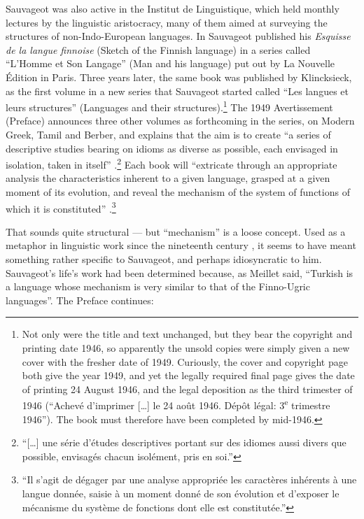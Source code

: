 \documentclass[output=paper]{langscibook}
\begin{document}
Sauvageot was also active in the Institut de Linguistique, which held monthly lectures by the linguistic aristocracy, many of them aimed at surveying the structures of non-Indo-European languages. In \citeyear{Sauvageot1946} Sauvageot published his \emph{Esquisse de la langue finnoise} (Sketch of the Finnish language) in a series called ``L’Homme et Son Langage'' (Man and his language) put out by La Nouvelle Édition in Paris. Three years later, the same book was published by Klincksieck, as the first volume in a new series that Sauvageot started called ``Les langues et leurs structures'' (Languages and their structures).\footnote{Not only were the title and text unchanged, but they bear the copyright and printing date 1946, so apparently the unsold copies were simply given a new cover with the fresher date of 1949. Curiously, the cover and copyright page both give the year 1949, and yet the legally required final page gives the date of printing 24 August 1946, and the legal deposition as the third trimester of 1946 (``Achevé d'imprimer […] le 24 août 1946. Dépôt légal: 3\textsuperscript{e} trimestre 1946''). The book must therefore have been completed by mid-1946.} The 1949 Avertissement (Preface) announces three other volumes as forthcoming in the series, on Modern Greek, Tamil and Berber, and explains that the aim is to create ``a series of descriptive studies bearing on idioms as diverse as possible, each envisaged in isolation, taken in itself'' \citep[7]{Sauvageot1946}.\footnote{``[…] une série d'études descriptives portant sur des idiomes aussi divers que possible, envisagés chacun isolément, pris en soi.''} Each book will ``extricate through an appropriate analysis the characteristics inherent to a given language, grasped at a given moment of its evolution, and reveal the mechanism of the system of functions of which it is constituted'' \citep[7]{Sauvageot1946}.\footnote{``Il s'agit de dégager par une analyse appropriée les caractères inhérents à une langue donnée, saisie à un moment donné de son évolution et d'exposer le mécanisme du système de fonctions dont elle est constitutée.''}

That sounds quite structural — but ``mechanism'' is a loose concept. Used as a metaphor in linguistic work since the nineteenth century \citep[see][]{Joseph2018hj}, it seems to have meant something rather specific to Sauvageot, and perhaps idiosyncratic to him. Sauvageot's life's work had been determined because, as Meillet said, ``Turkish is a language whose mechanism is very similar to that of the Finno-Ugric languages''. The Preface continues:
\end{document}
